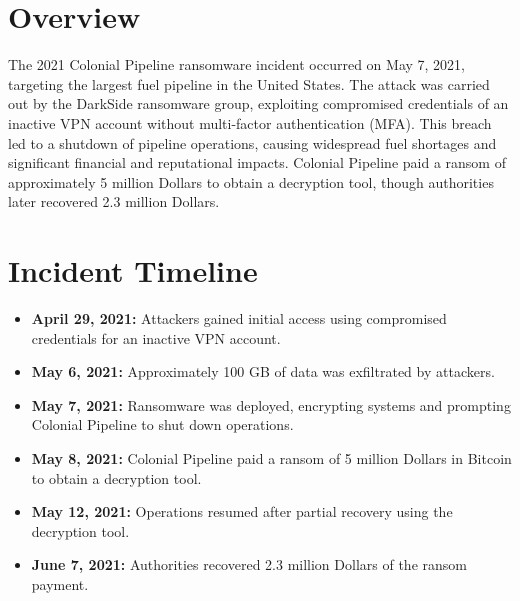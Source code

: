 \documentclass[11pt]{article}
\begin{document}
\tableofcontents
\thispagestyle{empty}
\clearpage

\setcounter{page}{1}

\section{Overview}
The 2021 Colonial Pipeline ransomware incident occurred on May 7, 2021, targeting the largest fuel pipeline in the United States. The attack was carried out by the DarkSide ransomware group, exploiting compromised credentials of an inactive VPN account without multi-factor authentication (MFA). This breach led to a shutdown of pipeline operations, causing widespread fuel shortages and significant financial and reputational impacts. Colonial Pipeline paid a ransom of approximately 5 million Dollars to obtain a decryption tool, though authorities later recovered 2.3 million Dollars.

\section{Incident Timeline}
\begin{itemize}
    \item \textbf{April 29, 2021:} Attackers gained initial access using compromised credentials for an inactive VPN account.
    \item \textbf{May 6, 2021:} Approximately 100 GB of data was exfiltrated by attackers.
    \item \textbf{May 7, 2021:} Ransomware was deployed, encrypting systems and prompting Colonial Pipeline to shut down operations.
    \item \textbf{May 8, 2021:} Colonial Pipeline paid a ransom of 5 million Dollars in Bitcoin to obtain a decryption tool.
    \item \textbf{May 12, 2021:} Operations resumed after partial recovery using the decryption tool.
    \item \textbf{June 7, 2021:} Authorities recovered 2.3 million Dollars of the ransom payment.
\end{itemize}
\end{document}
